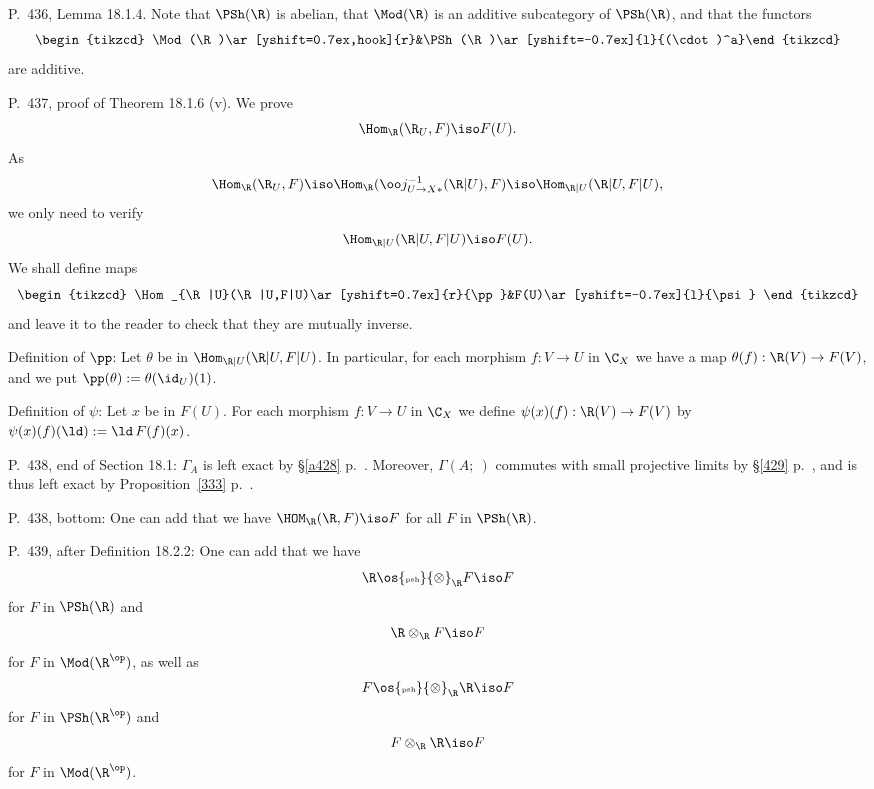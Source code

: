 \documentclass[12pt]{article}
\theoremstyle{remark}
\theoremstyle{definition}
\begin{document}
%

\begin{s}
P.~436, Lemma 18.1.4. Note that $\PSh(\R)$ is abelian, that $\Mod(\R)$ is an additive subcategory of $\PSh(\R)$, and that the functors
$$
\begin{tikzcd}
\Mod(\R)\ar[yshift=0.7ex,hook]{r}&\PSh(\R)\ar[yshift=-0.7ex]{l}{(\cdot)^a}\end{tikzcd}
$$ 
are additive.
\end{s} 

%

\begin{s} 
P.~437, proof of Theorem 18.1.6 (v). We prove 
$$
\Hom_\R(\R_U,F)\iso F(U).
$$ 
As 
$$
\Hom_\R(\R_U,F)\iso\Hom_\R(\oo j_{U\to X*}^{-1}(\R|U),F)\iso
\Hom_{\R|U}(\R|U,F|U), 
$$ 
we only need to verify 
$$
\Hom_{\R|U}(\R|U,F|U)\iso F(U).
$$ 
We shall define maps 
$$
\begin{tikzcd}
\Hom_{\R|U}(\R|U,F|U)\ar[yshift=0.7ex]{r}{\pp}&F(U)\ar[yshift=-0.7ex]{l}{\psi}
\end{tikzcd}
$$ 
and leave it to the reader to check that they are mutually inverse. 

Definition of $\pp$: Let $\theta$ be in $\Hom_{\R|U}(\R|U,F|U)$. In particular, for each morphism $f:V\to U$ in $\C_X$ we have a map $\theta(f):\R(V)\to F(V)$, and we put $\pp(\theta):=\theta(\id_U)(1)$. 

Definition of $\psi$: Let $x$ be in $F(U)$. For each morphism $f:V\to U$ in $\C_X$ we define $\psi(x)(f):\R(V)\to F(V)$ by $\psi(x)(f)(\ld):=\ld\,F(f)(x)$.
\end{s}

%

\begin{s}
P.~438, end of Section 18.1: $\Gamma_A$ is left exact by \S\ref{a428} p.~. Moreover, $\Gamma(A;\ )$ commutes with small projective limits by \S\ref{429} p.~, and is thus left exact by Proposition~\ref{333} p.~. 
\end{s} 

% 

\begin{s}
P.~438, bottom: One can add that we have $\HOM_\R(\R,F)\iso F$ for all $F$ in $\PSh(\R)$. 
\end{s} 

% 

\begin{s}
P.~439, after Definition 18.2.2: One can add that we have 
$$
\R\os{\text{\tiny psh}}{\otimes}_\R F\iso F
$$ 
for $F$ in $\PSh(\R)$ and 
$$
\R\otimes_\R F\iso F
$$ 
for $F$ in $\Mod(\R^{\op})$, as well as 
$$F\os{\text{\tiny psh}}{\otimes}_\R\R\iso F
$$ 
for $F$ in $\PSh(\R^{\op})$ and 
$$
F\otimes_\R\R\iso F
$$ 
for $F$ in $\Mod(\R^{\op})$. 
\end{s} 
\end{document}
